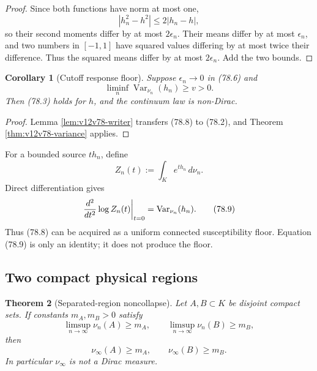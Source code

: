 \documentclass[11pt]{article}
\newtheorem{theorem}{Theorem}[section]
\newtheorem{corollary}[theorem]{Corollary}
\theoremstyle{remark}
\begin{document}
\begin{proof}
Since both functions have norm at most one,
\[
 |h_n^2-h^2|\leq2|h_n-h|,
\]
so their second moments differ by at most \(2\epsilon_n\).  Their
means differ by at most \(\epsilon_n\), and two numbers in
\([-1,1]\) have squared values differing by at most twice their
difference.  Thus the squared means differ by at most
\(2\epsilon_n\).  Add the two bounds.
\end{proof}

\begin{corollary}[Cutoff response floor]
\label{cor:v12v78-cutoff}
Suppose \(\epsilon_n\to0\) in (78.6) and
\begin{equation}
                  \liminf_n
                  \operatorname{Var}_{\nu_n}(h_n)\geq v>0.  \tag{78.8}
\end{equation}
Then (78.3) holds for \(h\), and the continuum law is non-Dirac.
\end{corollary}

\begin{proof}
Lemma \ref{lem:v12v78-writer} transfers (78.8) to (78.2), and
Theorem \ref{thm:v12v78-variance} applies.
\end{proof}

For a bounded source \(t h_n\), define
\[
 Z_n(t):=\int_K e^{t h_n}\,d\nu_n.
\]
Direct differentiation gives
\begin{equation}
 \left.{d^2\over dt^2}\log Z_n(t)\right|_{t=0}
 =\operatorname{Var}_{\nu_n}(h_n).                          \tag{78.9}
\end{equation}
Thus (78.8) can be acquired as a uniform connected susceptibility
floor.  Equation (78.9) is only an identity; it does not produce the
floor.

\subsection{Two compact physical regions}

\begin{theorem}[Separated-region noncollapse]
\label{thm:v12v78-two-regions}
Let \(A,B\subset K\) be disjoint compact sets.  If constants
\(m_A,m_B>0\) satisfy
\begin{equation}
 \limsup_{n\to\infty}\nu_n(A)\geq m_A,\qquad
 \limsup_{n\to\infty}\nu_n(B)\geq m_B,                       \tag{78.10}
\end{equation}
then
\begin{equation}
 \nu_\infty(A)\geq m_A,\qquad
 \nu_\infty(B)\geq m_B.                                     \tag{78.11}
\end{equation}
In particular \(\nu_\infty\) is not a Dirac measure.
\end{theorem}
\end{document}
